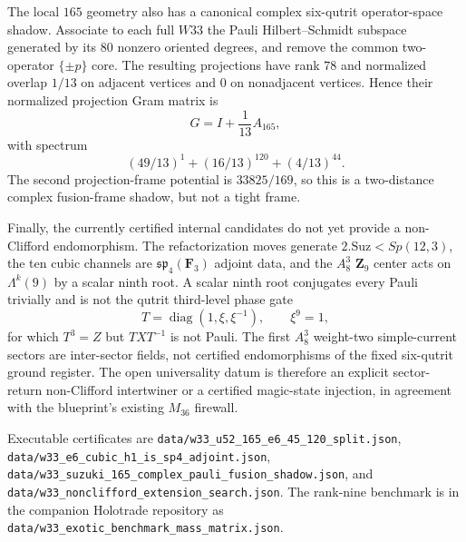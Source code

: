 The local $165$ geometry also has a canonical complex six-qutrit operator-space shadow.  Associate to each full $W33$ the Pauli Hilbert--Schmidt subspace generated by its $80$ nonzero oriented degrees, and remove the common two-operator $\{\pm p\}$ core.  The resulting projections have rank $78$ and normalized overlap $1/13$ on adjacent vertices and $0$ on nonadjacent vertices.  Hence their normalized projection Gram matrix is
\[
 G=I+\frac1{13}A_{165},
\]
with spectrum
\[
 (49/13)^1+(16/13)^{120}+(4/13)^{44}.
\]
The second projection-frame potential is $33825/169$, so this is a two-distance complex fusion-frame shadow, but not a tight frame.

Finally, the currently certified internal candidates do not yet provide a non-Clifford endomorphism.  The refactorization moves generate $2.\mathrm{Suz}<Sp(12,3)$, the ten cubic channels are $\mathfrak{sp}_4(\mathbf F_3)$ adjoint data, and the $A_8^3$ $\mathbf Z_9$ center acts on $\Lambda^k(9)$ by a scalar ninth root.  A scalar ninth root conjugates every Pauli trivially and is not the qutrit third-level phase gate
\[
 T=\operatorname{diag}(1,\xi,\xi^{-1}),\qquad \xi^9=1,
\]
for which $T^3=Z$ but $TXT^{-1}$ is not Pauli.  The first $A_8^3$ weight-two simple-current sectors are inter-sector fields, not certified endomorphisms of the fixed six-qutrit ground register.  The open universality datum is therefore an explicit sector-return non-Clifford intertwiner or a certified magic-state injection, in agreement with the blueprint's existing $M_{36}$ firewall.

Executable certificates are
\texttt{data/w33\_u52\_165\_e6\_45\_120\_split.json},
\texttt{data/w33\_e6\_cubic\_h1\_is\_sp4\_adjoint.json},
\texttt{data/w33\_suzuki\_165\_complex\_pauli\_fusion\_shadow.json}, and
\texttt{data/w33\_nonclifford\_extension\_search.json}.  The rank-nine benchmark is in the companion Holotrade repository as
\texttt{data/w33\_exotic\_benchmark\_mass\_matrix.json}.
